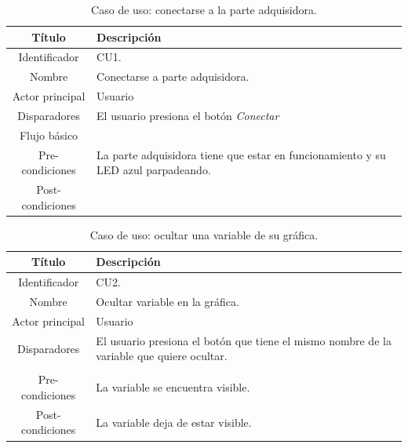 \begin{table}[htpb]
	\centering
	\caption{Caso de uso: conectarse a la parte adquisidora.}
	\centering
	\begin{tabular}{c p{}}    
		\toprule
		\textbf{Título }     & \textbf{Descripción} \\
		\midrule
		Identificador		&  CU1. \\
		Nombre				&   Conectarse a parte adquisidora. \\
		Actor principal		&   Usuario \\
		Disparadores		&   El usuario presiona el botón \textit{Conectar} \\
		Flujo básico		&   \\
		Pre-condiciones		&   La parte adquisidora tiene que estar en funcionamiento y su LED azul parpadeando. \\
		Post-condiciones	&    \\
		\bottomrule
	\end{tabular}
\label{tab:caso-conectar}
\end{table}

\begin{table}[htpb]
	\centering
	\caption{Caso de uso: ocultar una variable de su gráfica.}
	\centering
	\begin{tabular}{c p{}}    
		\toprule
		\textbf{Título }     & \textbf{Descripción} \\
		\midrule
		Identificador		&  CU2. \\
		Nombre				&   Ocultar variable en la gráfica. \\
		Actor principal		&   Usuario \\
		Disparadores		&   El usuario presiona el botón que tiene el mismo nombre de la variable que quiere ocultar. \\
\\
		Pre-condiciones		&   La variable se encuentra visible. \\
		Post-condiciones	&   La variable deja de estar visible.\\
		\bottomrule
	\end{tabular}
\label{tab:caso-ocultar}
\end{table}

